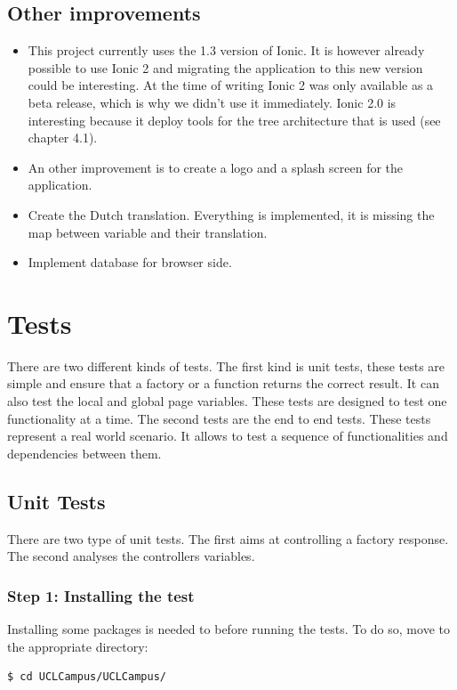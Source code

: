\documentclass{eplmastersthesis}
\begin{document}
\subsection{Other improvements}
\begin{itemize}
\item This project currently uses the 1.3 version of Ionic. It is however already possible to use Ionic 2 and migrating the application to this new version could be interesting. At the time of writing Ionic 2 was only available as a beta release, which is why we didn't use it immediately. Ionic 2.0 is interesting because it deploy tools for the tree architecture that is used (see chapter 4.1).
\item An other improvement is to create a logo and a splash screen for the application.
\item Create the Dutch translation. Everything is implemented, it is missing the map between variable and their translation.
\item Implement database for browser side. 
\end{itemize}

\section{Tests}

There are two different kinds of tests. The first kind is unit tests, these tests are simple and ensure that a factory or a function returns the correct result. It can also test the local and global page variables. These tests are designed to test one functionality at a time.
The second tests are the end to end tests. These tests represent a real world scenario. It allows to test a sequence of functionalities and dependencies between them.
\subsection{Unit Tests}
There are two type of unit tests. The first aims at controlling a factory response. The second analyses the controllers variables.
\subsubsection{Step 1: Installing the test}
Installing some packages is needed to before running the tests. To do so, move to the appropriate directory:
\begin{lstlisting}[language=bash]
   $ cd UCLCampus/UCLCampus/
\end{lstlisting}
\end{document}
